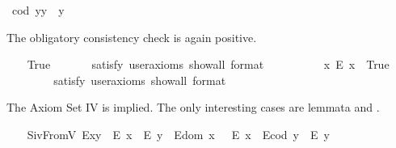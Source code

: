 \begin{isabellebody}
\ {\isachardoublequoteopen}{\isacharparenleft}cod\ y{\isacharparenright}{\isasymcdot}y\ {\isasymcong}\ y{\isachardoublequoteclose}%
\begin{isamarkuptext}%
The obligatory consistency check is again positive.%
\end{isamarkuptext}\isamarkuptrue%
\ \ \isamarkupfalse%
\ True\ %
\isanewline
\ \ \ \ \isamarkupfalse%
\ {\isacharbrackleft}satisfy{\isacharcomma}\ user{\isacharunderscore}axioms{\isacharcomma}\ show{\isacharunderscore}all{\isacharcomma}\ format\ {\isacharequal}\ {}{\isacharbrackright}%
\isadelimproof
\ %
\endisadelimproof
%
\isatagproof
{}\isamarkupfalse%
%
\endisatagproof
{\isafoldproof}%
%
\isadelimproof
%
\endisadelimproof
\ \isanewline
\ \ \isamarkupfalse%
\ \ {\isachardoublequoteopen}{\isasymexists}x{\isachardot}\ \isactrlbold {\isasymnot}{\isacharparenleft}E\ x{\isacharparenright}{\isachardoublequoteclose}\ \ True\ \ %
\ \ \isanewline
\ \ \ \ \isamarkupfalse%
\ {\isacharbrackleft}satisfy{\isacharcomma}\ user{\isacharunderscore}axioms{\isacharcomma}\ show{\isacharunderscore}all{\isacharcomma}\ format\ {\isacharequal}\ {}{\isacharbrackright}%
\isadelimproof
\ %
\endisadelimproof
%
\isatagproof
{}\isamarkupfalse%
%
\endisatagproof
{\isafoldproof}%
%
\isadelimproof
%
\endisadelimproof
%
\begin{isamarkuptext}%
The Axiom Set IV is implied. The only interesting cases are 
 lemmata  and .%
\end{isamarkuptext}\isamarkuptrue%
\ \ \isamarkupfalse%
\ S\isactrlsub i\isactrlsub vFromV{\isacharcolon}\ {\isachardoublequoteopen}{\isacharparenleft}E{\isacharparenleft}x{\isasymcdot}y{\isacharparenright}\ \isactrlbold {\isasymrightarrow}\ {\isacharparenleft}E\ x\ \isactrlbold {\isasymand}\ E\ y{\isacharparenright}{\isacharparenright}\ \isactrlbold {\isasymand}\ {\isacharparenleft}E{\isacharparenleft}dom\ x\ {\isacharparenright}\ \isactrlbold {\isasymrightarrow}\ E\ x{\isacharparenright}\ \isactrlbold {\isasymand}\ {\isacharparenleft}E{\isacharparenleft}cod\ y{\isacharparenright}\ \isactrlbold {\isasymrightarrow}\ E\ y{\isacharparenright}{\isachardoublequoteclose}\ \ \ \isanewline
%
\isadelimproof
\ \ \ \ %
\endisadelimproof
%
\isatagproof

\end{isabellebody}
